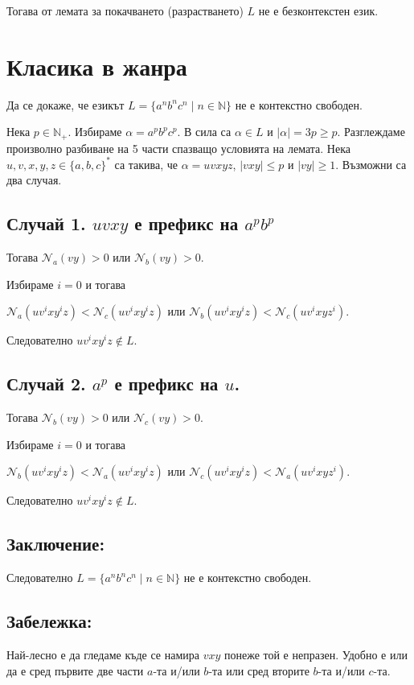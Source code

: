 \documentclass[12pt]{article}
\begin{document}
Тогава от лемата за покачването (разрастването) \(L\) не е безконтекстен език.

\section*{Класика в жанра}
Да се докаже, че езикът \(L = \{a^n b^n c^n \mid n \in \mathbb{N}\}\) не е контекстно свободен.

Нека \(p \in \mathbb{N}_+\). Избираме \(\alpha = a^p b^p c^p\). В сила са \(\alpha \in L\) и \(|\alpha| = 3p \geq p\).
Разглеждаме произволно разбиване на 5 части спазващо условията на лемата.
Нека \(u, v, x, y, z \in \{a, b, c\}^*\) са такива, че \(\alpha = uvxyz\), \(|vxy| \leq p\) и \(|vy| \geq 1\).
Възможни са два случая.

\subsection*{Случай 1. \(uvxy\) е префикс на \(a^p b^p\)}
Тогава \(\mathcal{N}_a(vy) > 0\) или \(\mathcal{N}_b(vy) > 0\).

Избираме \(i = 0\) и тогава

\(\mathcal{N}_a(uv^ixy^iz) < \mathcal{N}_c(uv^ixy^iz)\) или \(\mathcal{N}_b(uv^ixy^iz) < \mathcal{N}_c(uv^ixyz^i)\).

Следователно \(uv^ixy^iz \not \in L\).

\subsection*{Случай 2. \(a^p\) е префикс на \(u\).}
Тогава \(\mathcal{N}_b(vy) > 0\) или \(\mathcal{N}_c(vy) > 0\).

Избираме \(i = 0\) и тогава

\(\mathcal{N}_b(uv^ixy^iz) < \mathcal{N}_a(uv^ixy^iz)\) или \(\mathcal{N}_c(uv^ixy^iz) < \mathcal{N}_a(uv^ixyz^i)\).

Следователно \(uv^ixy^iz \not \in L\).

\subsection*{Заключение:}
Следователно \(L = \{a^n b^n c^n \mid n \in \mathbb{N}\}\) не е контекстно свободен.

\subsection*{Забележка:}
Най-лесно е да гледаме къде се намира \(vxy\) понеже той е непразен.
Удобно е или да е сред първите две части \(a\)-та и/или \(b\)-та
или сред вторите \(b\)-та и/или \(c\)-та.
\end{document}
